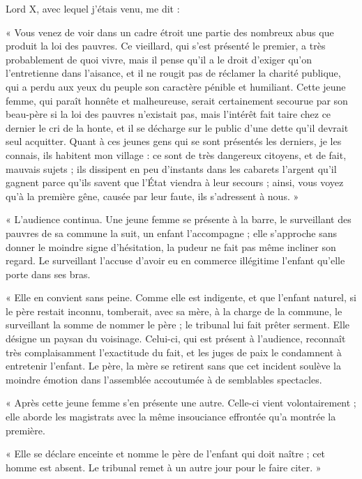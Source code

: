 \documentclass[french,twoside]{book} %
\newenvironment{quoteblock}%
  {\begin{quoting}}
  {\end{quoting}}
\newenvironment{quotebar}{%
    \def\FrameCommand{{\color{rubric!10!}\vrule width 0.5em} \hspace{0.9em}}%
    \def\OuterFrameSep{\itemsep} %
    \MakeFramed {\advance\hsize-\width \FrameRestore}
  }%
  {%
    \endMakeFramed
  }
\renewenvironment{quoteblock}%
  {%
    \savenotes
    \setstretch{0.9}
    \begin{quotebar}
  }
  {%
    \end{quotebar}
    \spewnotes
  }
\begin{document}
\noindent Lord X, avec lequel j’étais venu, me dit :\par

\begin{quoteblock}
\noindent « Vous venez de voir dans un cadre étroit une partie des nombreux abus que produit la loi des pauvres. Ce vieillard, qui s’est présenté le premier, a très probablement de quoi vivre, mais il pense qu’il a le droit d’exiger qu’on l’entretienne dans l’aisance, et il ne rougit pas de réclamer la charité publique, qui a perdu aux yeux du peuple son caractère pénible et humiliant. Cette jeune femme, qui paraît honnête et malheureuse, serait certainement secourue par son beau-père si la loi des pauvres n’existait pas, mais l’intérêt fait taire chez ce dernier le cri de la honte, et il se décharge sur le public d’une dette qu’il devrait seul acquitter. Quant à ces jeunes gens qui se sont présentés les derniers, je les connais, ils habitent mon village : ce sont de très dangereux citoyens, et de fait, mauvais sujets ; ils dissipent en peu d’instants dans les cabarets l’argent qu’il gagnent parce qu’ils savent que l’État viendra à leur secours ; ainsi, vous voyez qu’à la première gêne, causée par leur faute, ils s’adressent à nous. »
\end{quoteblock}


\begin{quoteblock}
\noindent « L'audience continua. Une jeune femme se présente à la barre, le surveillant des pauvres de sa commune la suit, un enfant l’accompagne ; elle s’approche sans donner le moindre signe d’hésitation, la pudeur ne fait pas même incliner son regard. Le surveillant l’accuse d’avoir eu en commerce illégitime l’enfant qu’elle porte dans ses bras.\par
« Elle en convient sans peine. Comme elle est indigente, et que l’enfant naturel, si le père restait inconnu, tomberait, avec sa mère, à la charge de la commune, le surveillant la somme de nommer le père ; le tribunal lui fait prêter serment. Elle désigne un paysan du voisinage. Celui-ci, qui est présent à l’audience, reconnaît très complaisamment l’exactitude du fait, et les juges de paix le condamnent à entretenir l’enfant. Le père, la mère se retirent sans que cet incident soulève la moindre émotion dans l’assemblée accoutumée à de semblables spectacles.\par
« Après cette jeune femme s’en présente une autre. Celle-ci vient volontairement ; elle aborde les magistrats avec la même insouciance effrontée qu’a montrée la première.\par
« Elle se déclare enceinte et nomme le père de l’enfant qui doit naître ; cet homme est absent. Le tribunal remet à un autre jour pour le faire citer. »
\end{quoteblock}
\end{document}
